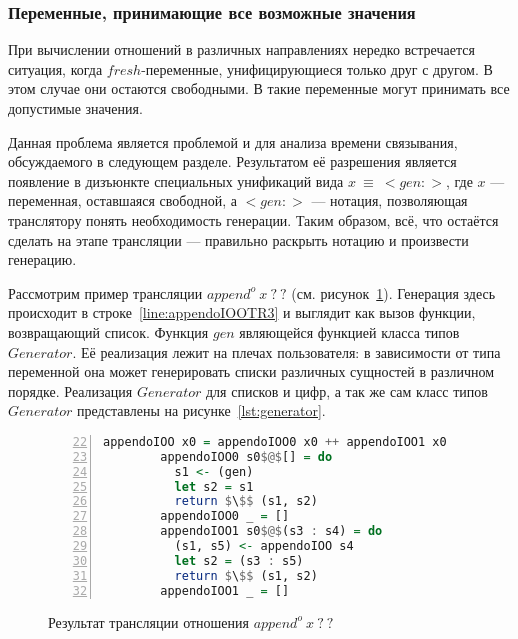 
\subsubsection{Переменные, принимающие все возможные значения}

При вычислении отношений в различных направлениях нередко встречается ситуация, когда $fresh$-переменные, унифицирующиеся только друг с другом.
В этом случае они остаются свободными.
В \miniKanren{} такие переменные могут принимать все допустимые значения.

Данная проблема является проблемой и для анализа времени связывания, обсуждаемого в следующем разделе.
Результатом её разрешения является появление в дизъюнкте специальных унификаций вида $x~\equiv~<gen:>$, где $x$ --- переменная, оставшаяся свободной, а $<gen:>$ --- нотация, позволяющая транслятору понять необходимость генерации.
Таким образом, всё, что остаётся сделать на этапе трансляции --- правильно раскрыть нотацию и произвести генерацию.

Рассмотрим пример трансляции $append^o \ x \ ? \ ?$ (см. рисунок~\ref{lst:appendoIOOTR}).
Генерация здесь происходит в строке~\ref{line:appendoIOOTR3} и выглядит как вызов функции, возвращающий список.
Функция $gen$ являющейся функцией класса типов $Generator$.
Её реализация лежит на плечах пользователя: в зависимости от типа переменной она может генерировать списки различных сущностей в различном порядке.
Реализация $Generator$ для списков и цифр, а так же сам класс типов $Generator$ представлены на рисунке~\ref{lst:generator}.

\begin{figure}[h!]
  \begin{center}
  \begin{minipage}{0.8\textwidth}
  \begin{lstlisting}[language=Haskell, frame=single, numbers=left,numberstyle=\small, firstnumber=22, escapechar=|]
        appendoIOO x0 = appendoIOO0 x0 ++ appendoIOO1 x0
        appendoIOO0 s0$@$[] = do
          s1 <- (gen)                                    |\label{line:appendoIOOTR3}|
          let s2 = s1                                    
          return $\$$ (s1, s2)
        appendoIOO0 _ = []
        appendoIOO1 s0$@$(s3 : s4) = do
          (s1, s5) <- appendoIOO s4
          let s2 = (s3 : s5)
          return $\$$ (s1, s2)
        appendoIOO1 _ = []
    \end{lstlisting}
  \end{minipage}
  \end{center}
  \caption{Результат трансляции отношения $append^o \ x \ ? \ ?$}
  \label{lst:appendoIOOTR}
\end{figure}

